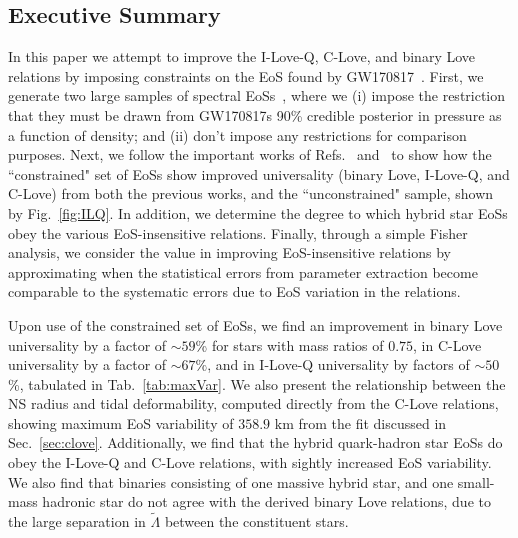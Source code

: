 \documentclass[prd,twocolumn,nofootinbib,superscriptaddress,amsmath,amssymb]{revtex4-1}
\begin{document}

\subsection{Executive Summary}
In this paper we attempt to improve the I-Love-Q, C-Love, and binary Love relations by imposing constraints on the EoS found by GW170817~\cite{LIGO:posterior,TheLIGOScientific:2017qsa}.
First, we generate two large samples of spectral EoSs~\cite{Lindblom:2018rfr}, where we (i) impose the restriction that they must be drawn from GW170817s 90\% credible posterior in pressure as a function of density; and (ii) don't impose any restrictions for comparison purposes.
Next, we follow the important works of Refs.~\cite{Yagi:binLove} and~\cite{Yagi:ILQ} to show how the ``constrained" set of EoSs show improved universality (binary Love, I-Love-Q, and C-Love) from both the previous works, and the ``unconstrained" sample, shown by Fig.~\ref{fig:ILQ}.
In addition, we determine the degree to which hybrid star EoSs obey the various EoS-insensitive relations.
Finally, through a simple Fisher analysis, we consider the value in improving EoS-insensitive relations by approximating when the statistical errors from parameter extraction become comparable to the systematic errors due to EoS variation in the relations.

Upon use of the constrained set of EoSs, we find an improvement in binary Love universality by a factor of $\sim 59$\% for stars with mass ratios of $0.75$, in C-Love universality by a factor of $\sim 67\%$, and in I-Love-Q universality by factors of $\sim50$\%, tabulated in Tab.~\ref{tab:maxVar}.
We also present the relationship between the NS radius and tidal deformability, computed directly from the C-Love relations, showing maximum EoS variability of $358.9 \text{ km}$ from the fit discussed in Sec.~\ref{sec:clove}.
Additionally, we find that the hybrid quark-hadron star EoSs do obey the I-Love-Q and C-Love relations, with sightly increased EoS variability.
We also find that binaries consisting of one massive hybrid star, and one small-mass hadronic star do not agree with the derived binary Love relations, due to the large separation in $\tilde{\Lambda}$ between the constituent stars.
\end{document}
